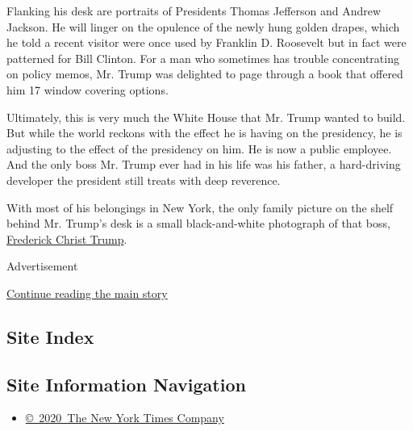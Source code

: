 Flanking his desk are portraits of Presidents Thomas Jefferson and
Andrew Jackson. He will linger on the opulence of the newly hung golden
drapes, which he told a recent visitor were once used by Franklin D.
Roosevelt but in fact were patterned for Bill Clinton. For a man who
sometimes has trouble concentrating on policy memos, Mr. Trump was
delighted to page through a book that offered him 17 window covering
options.

Ultimately, this is very much the White House that Mr. Trump wanted to
build. But while the world reckons with the effect he is having on the
presidency, he is adjusting to the effect of the presidency on him. He
is now a public employee. And the only boss Mr. Trump ever had in his
life was his father, a hard-driving developer the president still treats
with deep reverence.

With most of his belongings in New York, the only family picture on the
shelf behind Mr. Trump's desk is a small black-and-white photograph of
that boss,
\href{https://www.nytimes3xbfgragh.onion/2016/08/13/us/politics/fred-donald-trump-father.html}{Frederick
Christ Trump}.

Advertisement

\protect\hyperlink{after-bottom}{Continue reading the main story}

\hypertarget{site-index}{%
\subsection{Site Index}\label{site-index}}

\hypertarget{site-information-navigation}{%
\subsection{Site Information
Navigation}\label{site-information-navigation}}

\begin{itemize}
\tightlist
\item
  \href{https://help.nytimes3xbfgragh.onion/hc/en-us/articles/115014792127-Copyright-notice}{©~2020~The
  New York Times Company}
\end{itemize}

